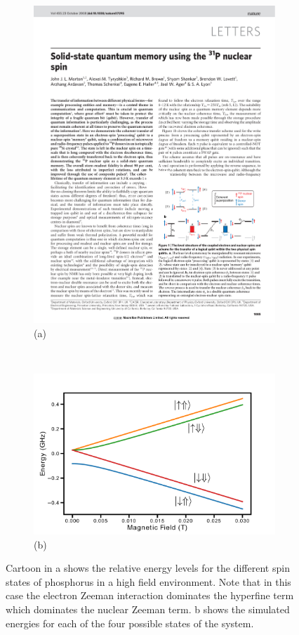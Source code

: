 \begin{figure}[t!]
\centering
\begin{subfigure}[t]{0.7\columnwidth}
\centering
\includegraphics[width = \columnwidth]{Figures/phosphorus.pdf}{(a)}
\end{subfigure}
~
\begin{subfigure}[t]{0.7\columnwidth}
\centering
\includegraphics[width = \columnwidth]{Figures/fields.pdf}{(b)}
\end{subfigure}
\caption[Phosphorus energy levels and transitions]{Cartoon in a shows the relative energy levels for the different spin states of phosphorus in a high field environment. Note that in this case the electron Zeeman interaction dominates the hyperfine term which dominates the nuclear Zeeman term. b shows the simulated energies for each of the four possible states of the system.}
\label{fig:phosLevels}
\end{figure}

